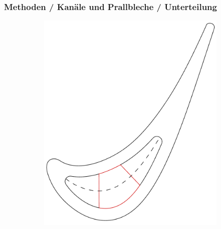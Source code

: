 \documentclass[8pt, aspectratio=169]{beamer}
\begin{document}
\begin{frame}
	\frametitle{Methoden / Kanäle und Prallbleche / Unterteilung}
	\vspace{-1cm}\hspace{-0.5cm}
	\begin{figure}
		\centering
		\begin{subfigure}[t]{.5\textwidth}
			\includegraphics[height=.8\textheight]{../tec/chambers/walls.png}
		\end{subfigure}
		\begin{subfigure}[t]{.48\textwidth}

\end{subfigure}
\end{figure}
\end{frame}
\end{document}
